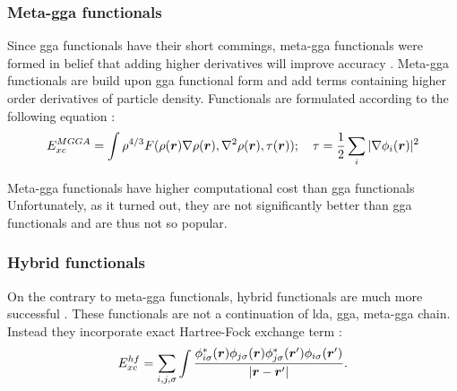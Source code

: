 \documentclass[openany, longbibliography,slovene,a4paper,12pt]{article}
\def\vec#1{\mbox{\boldmath$#1$}}
\begin{document}
\subsubsection{Meta-gga functionals}
Since gga functionals have their short commings, meta-gga functionals were formed
in belief that adding higher derivatives will improve accuracy
\cite{challenges_den_fun_theor}. Meta-gga functionals are build upon gga
functional form and add terms containing higher order derivatives of particle
density. Functionals are formulated according to the following equation
\cite{challenges_den_fun_theor}:
\begin{equation}
  E_{xc}^{MGGA}= \int \rho^{4/3}F(\rho(\vec r) \nabla \rho(\vec r), \nabla^2 \rho(\vec r), \tau(\vec r)); \quad \tau=\frac{1}{2}\sum_i |\nabla \phi_i(\vec r)|^2
   \end{equation}

Meta-gga functionals have higher computational cost than gga functionals
Unfortunately, as it turned out, they are not significantly better than gga
functionals and are thus not so popular.

\subsubsection{Hybrid functionals}
On the contrary to meta-gga functionals, hybrid functionals are much more
successful \cite{challenges_den_fun_theor}. These functionals are not a
continuation of lda, gga, meta-gga chain. Instead they incorporate exact
Hartree-Fock exchange term \cite{challenges_den_fun_theor}:
\begin{equation}
  E^{hf}_{xc}=\sum_ {i,j,\sigma}\int\frac{\phi^*_{i\sigma}(\vec r) \phi_{j\sigma}(\vec r) \phi^*_{j\sigma}(\vec r') \phi_{i\sigma}(\vec r')}{|\vec r - \vec r'|}.
\end{equation}
\end{document}
